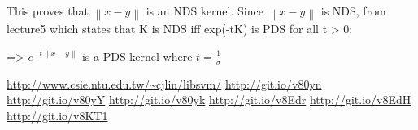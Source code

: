 \documentclass{article}
\begin{document}
\begin{description}
    This proves that \( \left\lVert x - y \right\rVert \) is an NDS kernel.  Since \( \left\lVert x - y \right\rVert \) is NDS, from lecture5 which states that K is NDS iff exp(-tK) is PDS for all t > 0: 

    => $e^{-t\left\lVert x - y \right\rVert} $  is a PDS kernel where $t = \frac{1}{\sigma} $
\end{description}

\begin{thebibliography}{1}
   \url{http://www.csie.ntu.edu.tw/~cjlin/libsvm/}
   \url{http://git.io/v80yn}
   \url{http://git.io/v80yY}
   \url{http://git.io/v80yk}
   \url{http://git.io/v8Edr}
   \url{http://git.io/v8EdH}
   \url{http://git.io/v8KT1}
\end{thebibliography}
\end{document}
